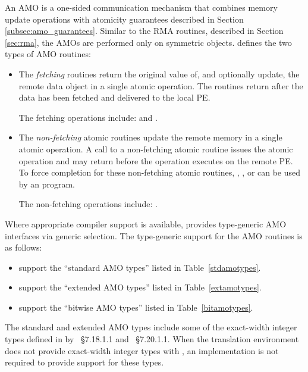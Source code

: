 An \ac{AMO} is a one-sided communication mechanism that combines memory update
operations with atomicity guarantees described in Section
\ref{subsec:amo_guarantees}.  Similar to the \ac{RMA} routines, described in
Section \ref{sec:rma}, the \acp{AMO} are performed only on symmetric objects.
\openshmem defines the two types of \ac{AMO} routines:
\begin{itemize}
\item
The \textit{fetching} routines return the original value of, and optionally
update, the remote data object in a single atomic operation.  The routines
return after the data has been fetched and delivered to the local \ac{PE}.

The fetching operations include:
 and
.

\item
The \textit{non-fetching} atomic routines update the remote memory in a single
atomic operation.  A call to a non-fetching atomic routine issues the atomic
operation and may return before the operation executes on the remote \ac{PE}.
To force completion for these non-fetching atomic routines,
, , or  can
be used by an \openshmem program.

The non-fetching operations include:
.
\end{itemize}

Where appropriate compiler support is available, \openshmem provides
type-generic \ac{AMO} interfaces via \Cstd[11] generic selection.
The type-generic support for the \ac{AMO} routines is as follows:

\begin{itemize}
\item {} support
      the ``standard \ac{AMO} types'' listed in Table~\ref{stdamotypes}.
\item {} support
      the ``extended \ac{AMO} types'' listed in Table~\ref{extamotypes}.
\item {}
      support the ``bitwise \ac{AMO} types'' listed in Table~\ref{bitamotypes}.
\end{itemize}

The standard and extended \ac{AMO} types include some of the exact-width
integer types defined in  by \Cstd[99]~\S7.18.1.1 and
\Cstd[11]~\S7.20.1.1. When the \Cstd translation environment
does not provide exact-width integer types with , an
\openshmem implementation is not required to provide support for these types.

